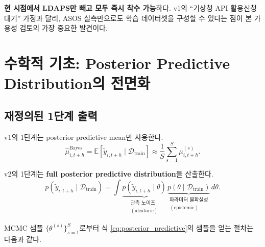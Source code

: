 \documentclass[11pt,a4paper]{article}
\begin{document}
\textbf{현 시점에서 LDAPS만 빼고 모두 즉시 착수 가능}하다. v1의 ``기상청 API 활용신청 대기'' 가정과 달리, ASOS 실측만으로도 학습 데이터셋을 구성할 수 있다는 점이 본 가용성 검토의 가장 중요한 발견이다.

\section{수학적 기초: Posterior Predictive Distribution의 전면화}

\subsection{재정의된 1단계 출력}

v1의 1단계는 posterior predictive mean만 사용한다.
\begin{equation}
    \hat\mu^{\mathrm{Bayes}}_{i,t+h} = \mathbb{E}[\tilde y_{i,t+h}\mid\mathcal{D}_{\mathrm{train}}]
    \approx \frac{1}{S}\sum_{s=1}^{S}\mu^{(s)}_{i,t+h}.
\end{equation}

v2의 1단계는 \textbf{full posterior predictive distribution}을 산출한다.
\begin{equation}
    p(\tilde y_{i,t+h}\mid\mathcal{D}_{\mathrm{train}}) = \int \underbrace{p(\tilde y_{i,t+h}\mid\theta)}_{\substack{\text{관측 노이즈}\\(\text{aleatoric})}}\,\underbrace{p(\theta\mid\mathcal{D}_{\mathrm{train}})}_{\substack{\text{파라미터 불확실성}\\(\text{epistemic})}}\,d\theta.
    \label{eq:posterior_predictive}
\end{equation}

MCMC 샘플 $\{\theta^{(s)}\}_{s=1}^{S}$로부터 식 \eqref{eq:posterior_predictive}의 샘플을 얻는 절차는 다음과 같다.
\end{document}
